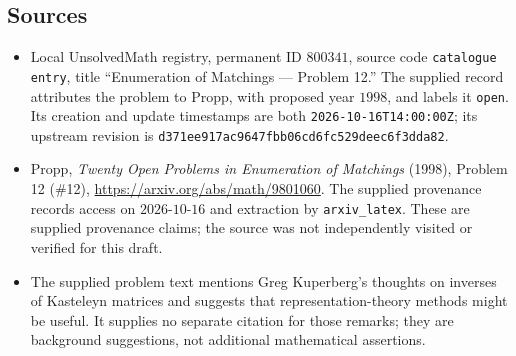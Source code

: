 \documentclass[11pt]{article}
\begin{document}
\subsection{Sources}
\begin{itemize}
\item Local UnsolvedMath registry, permanent ID \(800341\), source code \texttt{catalogue entry}, title ``Enumeration of Matchings --- Problem 12.'' The supplied record attributes the problem to Propp, with proposed year \(1998\), and labels it \texttt{open}. Its creation and update timestamps are both \texttt{2026-10-16T14:00:00Z}; its upstream revision is \texttt{d371ee917ac9647fbb06cd6fc529deec6f3dda82}.
\item Propp, \emph{Twenty Open Problems in Enumeration of Matchings} (1998), Problem 12 (\#12), \url{https://arxiv.org/abs/math/9801060}. The supplied provenance records access on \(2026\text{-}10\text{-}16\) and extraction by \texttt{arxiv\_latex}. These are supplied provenance claims; the source was not independently visited or verified for this draft.
\item The supplied problem text mentions Greg Kuperberg's thoughts on inverses of Kasteleyn matrices and suggests that representation-theory methods might be useful. It supplies no separate citation for those remarks; they are background suggestions, not additional mathematical assertions.
\end{itemize}
\end{document}
